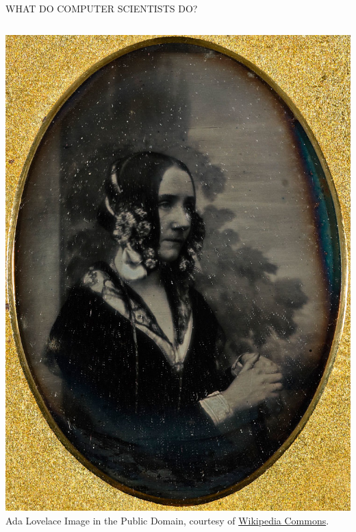 \documentclass[aspectratio=169]{beamer}
\begin{document}
\begin{frame}{WHAT DO COMPUTER SCIENTISTS DO?}
\begin{columns}
\begin{columns}
\includegraphics[scale=0.4]{graphics/ada_lovelace.jpg}
\tiny{Ada Lovelace
Image in the Public Domain, courtesy of \href{https://es.wikipedia.org/wiki/Ada_Lovelace}{Wikipedia Commons}.}
\end{columns}
\end{columns}
\end{frame}
\end{document}
